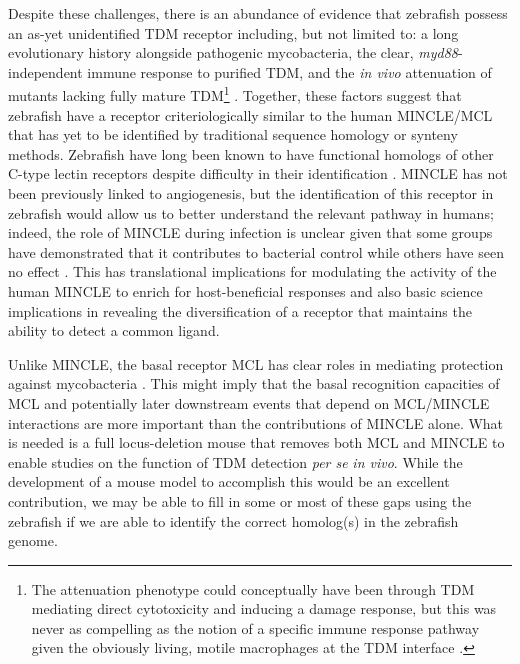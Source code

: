 Despite these challenges, there is an abundance of evidence that zebrafish possess an as\hyp{}yet unidentified TDM receptor including, but not limited to: a long evolutionary history alongside pathogenic mycobacteria, the clear, \textit{myd88}\hyp{}independent immune response to purified TDM, and the \textit{in vivo} attenuation of mutants lacking fully mature TDM\footnote{The attenuation phenotype could conceptually have been through TDM mediating direct cytotoxicity and inducing a damage response, but this was never as compelling as the notion of a specific immune response pathway given the obviously living, motile macrophages at the TDM interface \citep{Noll1956b, Bloch1953, Walton2018}.} \citep{Walton2018, Rao2005}. Together, these factors suggest that zebrafish have a receptor criteriologically similar to the human MINCLE/MCL that has yet to be identified by traditional sequence homology or synteny methods. Zebrafish have long been known to have functional homologs of other C\hyp{}type lectin receptors despite difficulty in their identification \citep{Petit2019, Panagos2006, Yoder2004}. MINCLE has not been previously linked to angiogenesis, but the identification of this receptor in zebrafish would allow us to better understand the relevant pathway in humans; indeed, the role of MINCLE during infection is unclear given that some groups have demonstrated that it contributes to bacterial control \citep{Behler2012, Behler2015, Lee2012} while others have seen no effect \citep{Heitmann2013}. This has translational implications for modulating the activity of the human MINCLE to enrich for host\hyp{}beneficial responses and also basic science implications in revealing the diversification of a receptor that maintains the ability to detect a common ligand. 

Unlike MINCLE, the basal receptor MCL has clear roles in mediating protection against mycobacteria \citep{Wilson2015}. This might imply that the basal recognition capacities of MCL and potentially later downstream events that depend on MCL/MINCLE interactions are more important than the contributions of MINCLE alone. What is needed is a full locus\hyp{}deletion mouse that removes both MCL and MINCLE to enable studies on the function of TDM detection \textit{per se} \textit{in vivo}. While the development of a mouse model to accomplish this would be an excellent contribution, we may be able to fill in some or most of these gaps using the zebrafish if we are able to identify the correct homolog(s) in the zebrafish genome.

